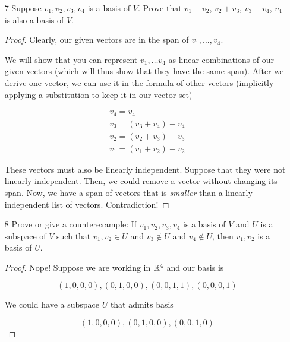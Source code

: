 \begin{enumerate}
    \begin{proof}
        If there is a spanning list of vectors in $U \cup W$, then there is also a basis in $U \cup W$ (since every spanning list can be reduced to a basis).
        
        We can thus a basis of $U$ attached to a basis in $W$ as our spanning list. This list spans $V$ because $V = U + W$ implies for every $v \in V, \exists u \in U, w \in W~ s.t.~ v = u + w$, and since we can create any $u + w$ in our new basis, we are done.
    \end{proof}

    \item[7] Suppose $v_1, v_2, v_3, v_4$ is a basis of $V$. Prove that
    $v_1 + v_2$, $v_2 + v_3$, $v_3 + v_4$, $v_4$ is also a basis of $V$.

    \begin{proof}

        Clearly, our given vectors are in the span of $v_1, \dots, v_4$. 

        We will show that you can represent $v_1, \dots v_4$ as linear combinations of our given vectors (which will thus show that they have the same span). After we derive one vector, we can use it in the formula of other vectors (implicitly applying a substitution to keep it in our vector set)

        \begin{align*}
            v_4 = v_4 \\
            v_3 = (v_3 + v_4) - v_4 \\
            v_2 = (v_2 + v_3) - v_3 \\
            v_1 = (v_1 + v_2) - v_2 
        \end{align*}

        These vectors must also be linearly independent. Suppose that they were not linearly independent. Then, we could remove a vector without changing its span. Now, we have a span of vectors that is \emph{smaller} than a linearly independent list of vectors. Contradiction!
    \end{proof}

    \item[8] Prove or give a counterexample: If $v_1, v_2, v_3, v_4$ is a basis of $V$
    and $U$ is a subspace of $V$ such that $v_1, v_2 \in U$ and $v_3 \notin U$ and
    $v_4 \notin U$, then $v_1, v_2$ is a basis of $U$.


    \begin{proof}
        Nope! Suppose we are working in $\mathbb{R}^4$ and our basis is 
        
        $$(1, 0, 0, 0), (0, 1, 0, 0), (0, 0, 1, 1), (0, 0, 0, 1)$$
        
        We could have a subspace $U$ that admits basis 
        
        $$(1, 0, 0, 0), (0, 1, 0, 0), (0, 0, 1, 0)$$
    \end{proof}

\end{enumerate}